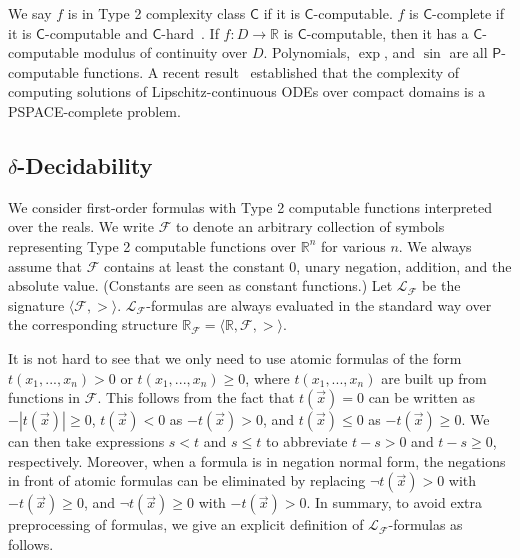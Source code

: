 \documentclass[envcountsect]{llncs}
\begin{document}
We say $f$ is in Type 2 complexity class $\mathsf{C}$ if it is $\mathsf{C}$-computable. $f$ is $\mathsf{C}$-complete if it is $\mathsf{C}$-computable and $\mathsf{C}$-hard~\cite{Kobook}. If $f:D\rightarrow \mathbb{R}$ is $\mathsf{C}$-computable, then it has a $\mathsf{C}$-computable modulus of continuity over $D$. Polynomials, $\exp$, and $\sin$ are all $\mathsf{P}$-computable functions. A recent result~\cite{Kawamura09} established that the complexity of computing solutions of Lipschitz-continuous ODEs over compact domains is a {\sf PSPACE}-complete problem. 

\subsection{$\delta$-Decidability}

We consider first-order formulas with Type 2 computable functions interpreted over the reals. We write $\mathcal{F}$ to denote an arbitrary collection of symbols representing Type 2 computable functions over $\mathbb{R}^n$ for various $n$. We always assume that $\mathcal{F}$ contains at least the constant $0$, unary negation, addition, and the absolute value. (Constants are seen as constant functions.) Let $\mathcal{L_{\mathcal{F}}}$ be the signature $\langle \mathcal{F}, >\rangle$. $\mathcal{L}_{\mathcal{F}}$-formulas are always evaluated in the standard way over the corresponding structure $\mathbb{R}_{\mathcal{F}}= \langle \mathbb{R}, \mathcal{F}, >\rangle$.  

It is not hard to see that we only need to use atomic formulas of the form $t(x_1,...,x_n)>0$ or $t(x_1,...,x_n)\geq 0$, where $t(x_1,...,x_n)$ are built up from functions in $\mathcal{F}$. This follows from the fact that $t(\vec x)=0$ can be written as $-|t(\vec x)|\geq 0$, $t(\vec x)<0$ as $-t(\vec x)>0$, and $t(\vec x)\leq 0$ as $-t(\vec x)\geq 0$. We can then take expressions $s <t $ and $s \leq t$ to abbreviate $t - s > 0$ and $t - s \geq 0$, respectively. Moreover, when a formula is in negation normal form, the negations in front of atomic formulas can be eliminated by replacing $\neg t(\vec x) > 0$ with $-t(\vec x)\geq 0$, and $\neg t(\vec x)\geq 0$ with $-t(\vec x)>0$. In summary, to avoid extra preprocessing of formulas, we give an explicit definition of $\mathcal{L}_{\mathcal{F}}$-formulas as follows.
\end{document}

